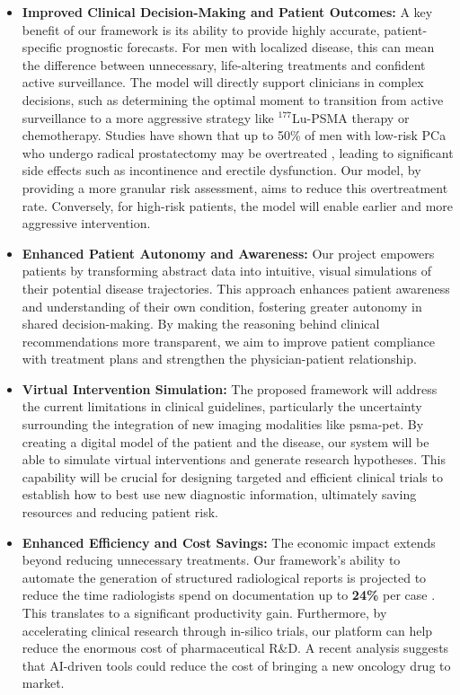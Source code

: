 \documentclass[11pt, a4paper]{article}
\begin{document}
\begin{itemize}
    \item \textbf{Improved Clinical Decision-Making and Patient Outcomes:} A key benefit of our framework is its ability to provide highly accurate, patient-specific prognostic forecasts. For men with localized disease, this can mean the difference between unnecessary, life-altering treatments and confident active surveillance. The model will directly support clinicians in complex decisions, such as determining the optimal moment to transition from active surveillance to a more aggressive strategy like $^{177}$Lu-PSMA therapy or chemotherapy. Studies have shown that up to 50\% of men with low-risk PCa who undergo radical prostatectomy may be overtreated \cite{HeijnsdijkWever2012}, leading to significant side effects such as incontinence and erectile dysfunction. Our model, by providing a more granular risk assessment, aims to reduce this overtreatment rate. Conversely, for high-risk patients, the model will enable earlier and more aggressive intervention.


    \item \textbf{Enhanced Patient Autonomy and Awareness:} Our project empowers patients by transforming abstract data into intuitive, visual simulations of their potential disease trajectories. This approach enhances patient awareness and understanding of their own condition, fostering greater autonomy in shared decision-making. By making the reasoning behind clinical recommendations more transparent, we aim to improve patient compliance with treatment plans and strengthen the physician-patient relationship.

\item \textbf{Virtual Intervention Simulation:} The proposed framework will address the current limitations in clinical guidelines, particularly the uncertainty surrounding the integration of new imaging modalities like \gls{psma}-\gls{pet}. By creating a digital model of the patient and the disease, our system will be able to simulate virtual interventions and generate research hypotheses. This capability will be crucial for designing targeted and efficient clinical trials to establish how to best use new diagnostic information, ultimately saving resources and reducing patient risk.

    \item \textbf{Enhanced Efficiency and Cost Savings:} The economic impact extends beyond reducing unnecessary treatments. Our framework's ability to automate the generation of structured radiological reports is projected to reduce the time radiologists spend on documentation up to \textbf{24\%} per case \cite{Acosta_2024}. This translates to a significant productivity gain. Furthermore, by accelerating clinical research through in-silico trials, our platform can help reduce the enormous cost of pharmaceutical R\&D. A recent analysis suggests that AI-driven tools could reduce the cost of bringing a new oncology drug to market.


\end{itemize}
\end{document}
